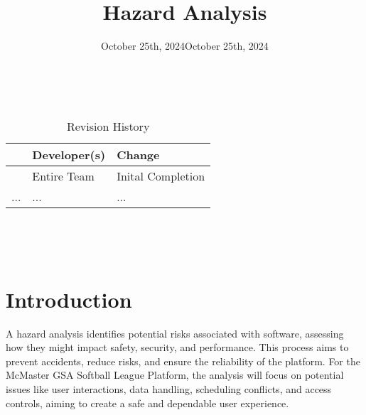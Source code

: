 \documentclass{article}
\title{Hazard Analysis\\\progname}
\author{\authname}
\date{October 25th, 2024}
\begin{document}
\maketitle
\thispagestyle{empty}

~\newpage


\begin{table}[hp]
    \caption{Revision History} \label{TblRevisionHistory}
    \begin{tabularx}{\textwidth}{llX}
        \toprule
        \textbf{}                 & \textbf{Developer(s)} & \textbf{Change}   \\
        \midrule
        \date{October 25th, 2024} & Entire Team           & Inital Completion \\
        ...                       & ...                   & ...               \\
        \bottomrule
    \end{tabularx}
\end{table}

~\newpage

\tableofcontents
\listoftables

~\newpage


\section{Introduction}
A hazard analysis identifies potential risks associated with software, assessing how they might impact safety, security, and performance. This process aims to prevent accidents, reduce risks, and ensure the reliability of the platform. For the McMaster GSA Softball League Platform, the analysis will focus on potential issues like user interactions, data handling, scheduling conflicts, and access controls, aiming to create a safe and dependable user experience.
\end{document}
